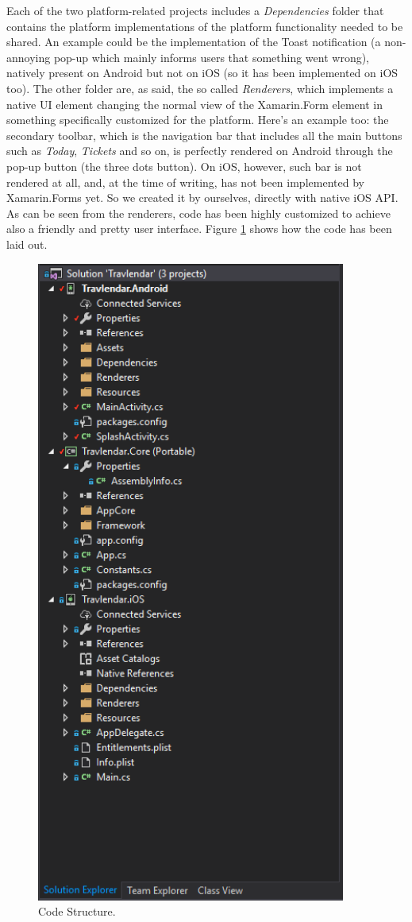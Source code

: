 Each of the two platform-related projects includes a \textit{Dependencies} folder that contains the platform implementations of the platform functionality needed to be shared. An example could be the implementation of the Toast notification (a non-annoying pop-up which mainly informs users that something went wrong), natively present on Android but not on iOS (so it has been implemented on iOS too). The other folder are, as said, the so called \textit{Renderers}, which implements a native UI element changing the normal view of the Xamarin.Form element in something specifically customized for the platform. Here's an example too: the secondary toolbar, which is the navigation bar that includes all the main buttons such as \textit{Today}, \textit{Tickets} and so on, is perfectly rendered on Android through the pop-up button (the three dots button). On iOS, however, such bar is not rendered at all, and, at the time of writing, has not been implemented by Xamarin.Forms yet. So we created it by ourselves, directly with native iOS API. As can be seen from the renderers, code has been highly customized to achieve also a friendly and pretty user interface. Figure \ref{fig:structure} shows how the code has been laid out.

\begin{figure}
	\centering
	\includegraphics[width=4in]{./images/code_structure.png}
	\caption{Code Structure.}
	\label{fig:structure}
\end{figure}
